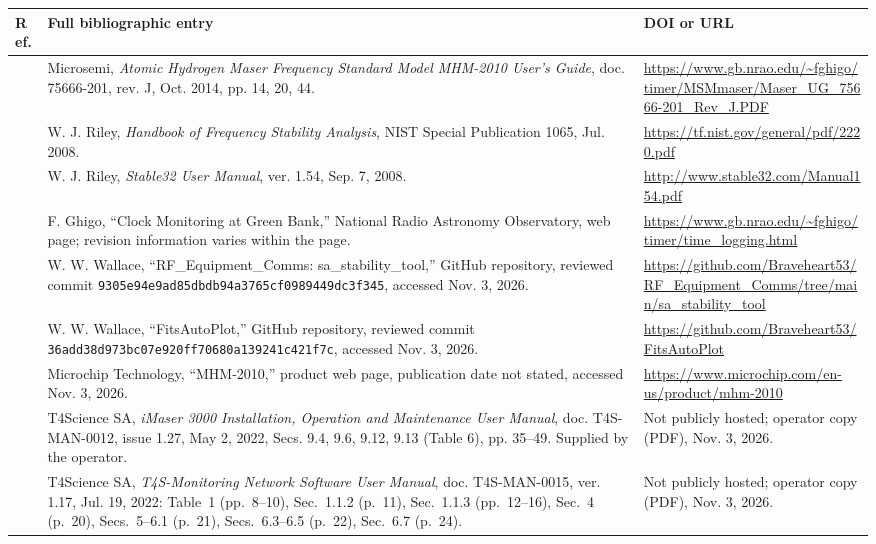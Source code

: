 \documentclass[11pt,a4paper]{article}
\begin{document}
\small
\begin{longtable}{@{}p{.05\linewidth}p{.53\linewidth}p{.34\linewidth}@{}}
\toprule
Ref. & Full bibliographic entry & DOI or URL\\
\midrule
\endhead
[1] & Microsemi, \textit{Atomic Hydrogen Maser Frequency Standard Model
MHM-2010 User's Guide}, doc. 75666-201, rev. J, Oct. 2014, pp. 14, 20, 44.
& \url{https://www.gb.nrao.edu/~fghigo/timer/MSMmaser/Maser_UG_75666-201_Rev_J.PDF}\\[5pt]
[2] & W. J. Riley, \textit{Handbook of Frequency Stability Analysis},
NIST Special Publication 1065, Jul. 2008.
& \url{https://tf.nist.gov/general/pdf/2220.pdf}\\[5pt]
[3] & W. J. Riley, \textit{Stable32 User Manual}, ver. 1.54,
Sep. 7, 2008.
& \url{http://www.stable32.com/Manual154.pdf}\\[5pt]
[4] & F. Ghigo, ``Clock Monitoring at Green Bank,'' National Radio Astronomy
Observatory, web page; revision information varies within the page.
& \url{https://www.gb.nrao.edu/~fghigo/timer/time_logging.html}\\[5pt]
[5] & W. W. Wallace, ``RF\_Equipment\_Comms: sa\_stability\_tool,''
GitHub repository, reviewed commit
\texttt{9305e94e9ad85dbdb94a3765cf0989449dc3f345}, accessed Nov. 3, 2026.
& \url{https://github.com/Braveheart53/RF_Equipment_Comms/tree/main/sa_stability_tool}\\[5pt]
[6] & W. W. Wallace, ``FitsAutoPlot,'' GitHub repository, reviewed commit
\texttt{36add38d973bc07e920ff70680a139241c421f7c}, accessed Nov. 3, 2026.
& \url{https://github.com/Braveheart53/FitsAutoPlot}\\[5pt]
[7] & Microchip Technology, ``MHM-2010,'' product web page, publication date
not stated, accessed Nov. 3, 2026.
& \url{https://www.microchip.com/en-us/product/mhm-2010}\\[5pt]
[8] & T4Science SA, \textit{iMaser 3000 Installation, Operation and Maintenance
User Manual}, doc. T4S-MAN-0012, issue 1.27, May 2, 2022, Secs. 9.4, 9.6, 9.12,
9.13 (Table 6), pp. 35--49. Supplied by the operator.
& Not publicly hosted; operator copy (PDF), Nov. 3, 2026.\\[5pt]
[9] & T4Science SA, \textit{T4S-Monitoring Network Software User Manual},
doc. T4S-MAN-0015, ver. 1.17, Jul. 19, 2022: Table~1 (pp.~8--10), Sec.~1.1.2 (p.~11),
Sec.~1.1.3 (pp.~12--16), Sec.~4 (p.~20), Secs.~5--6.1 (p.~21), Secs.~6.3--6.5 (p.~22), Sec.~6.7 (p.~24).
& Not publicly hosted; operator copy (PDF), Nov. 3, 2026.\\[5pt]

\end{longtable}
\end{document}
